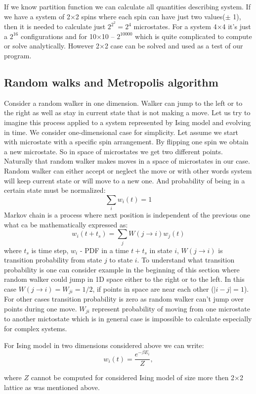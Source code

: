 \documentclass[10pt]{article}
\begin{document}
If we know partition function we can calculate all quantities describing system. If we have a system of 2$\times$2 spins where each spin can have just two values($\pm$ 1), then it is needed to calculate just $2^{2^{2}} = 2^4$ microstates. For a system 4$\times$4 it's just a $2^{16}$ configurations and for 10$\times$10 -- $2^{10000}$ which is quite complicated to compute or solve analytically. However 2$\times$2 case can be solved and used as a test of our program.



\subsection{Random walks and Metropolis algorithm}
Consider a random walker in one dimension. Walker can jump to the left or to the right as well as stay in current state that is not making a move. Let us try to imagine this process applied to a system represented by Ising model and evolving in time. We consider one-dimensional case for simplicity.
Let assume we start with microstate with a specific spin arrangement. By flipping one spin we obtain a new microstate. So in space of microstates we get two different points. Naturally that random walker makes moves in a space of microstates in our case.
Random walker can either accept or neglect the move or with other words system will keep
current state or will move to a new one. And probability of being in a certain state must be normalized:
\[
\sum_{i} {w_i(t)} = 1
\]
Markov chain is a process where next position is independent of the previous one what ca be mathematically expressed as:
\[
w_i(t+t_s)=\sum_{j} {W(j\rightarrow i)w_j(t)}
\]
where $t_s$ is time step, $w_i$ - PDF in a time $t+t_s$ in state $i$, $W(j\rightarrow i)$ is transition probability from state $j$ to state $i$. To understand what transition probability is one can consider example in the beginning of this section where random walker could jump in 1D space either to the right or to the left. In this case
$W(j\rightarrow i)=W_{ji}=1/2$, if points in space are near each other ($|i-j|=1$). For other cases transition probability is zero as random walker can't jump over points during one move.
$W_{ji}$ represent probability of moving from one microstate to another mictostate which is in general case is impossible to calculate especially for complex systems.


For Ising model in two dimensions considered above we can write:
\[
w_i(t) = \frac{e^{-\beta E_i}}{Z},
\]

where $Z$ cannot be computed for considered Ising model of size more then 2$\times$2 lattice as was mentioned above.
\end{document}
